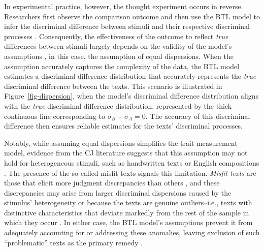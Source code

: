 \documentclass[
  authoryear,
  review,
  1p]{elsarticle}
\begin{document}
In experimental practice, however, the thought experiment occurs in
reverse. Researchers first observe the comparison outcome and then use
the BTL model to infer the discriminal difference between stimuli and
their respective discriminal processes \citep{Thurstone_1927a}.
Consequently, the effectiveness of the outcome to reflect \emph{true}
differences between stimuli largely depends on the validity of the
model's assumptions \citep{Kohler_et_al_2019}, in this case, the
assumption of equal dispersions. When the assumption accurately captures
the complexity of the data, the BTL model estimates a discriminal
difference distribution that accurately represents the \emph{true}
discriminal difference between the texts. This scenario is illustrated
in Figure~\ref{fig-dispersion}, when the model's discriminal difference
distribution aligns with the \emph{true} discriminal difference
distribution, represented by the thick continuous line corresponding to
\(\sigma_{B}-\sigma_{A}=0\). The accuracy of this discriminal difference
then ensures reliable estimates for the texts' discriminal processes.

Notably, while assuming equal dispersions simplifies the trait
measurement model, evidence from the CJ literature suggests that this
assumption may not hold for heterogeneous stimuli, such as handwritten
texts or English compositions
\citep{Thurstone_1927a, Andrich_1978, Bramley_2008, Kelly_et_al_2022}.
The presence of the so-called misfit texts signals this limitation.
\emph{Misfit texts} are those that elicit more judgment discrepancies
than others
\citep{Pollitt_2004, Pollitt_2012b, Pollitt_2012a, Goossens_et_al_2018},
and these discrepancies may arise from larger discriminal dispersions
caused by the stimulus' heterogeneity or because the texts are genuine
outliers--i.e., texts with distinctive characteristics that deviate
markedly from the rest of the sample in which they occur
\citep{Grubbs_1969}. In either case, the BTL model's assumptions prevent
it from adequately accounting for or addressing these anomalies, leaving
exclusion of such ``problematic'' texts as the primary remedy
\citep{Pollitt_2012a, Pollitt_2012b}.
\end{document}
